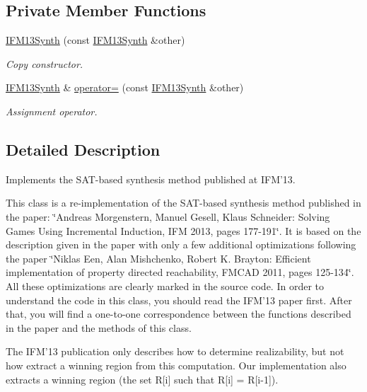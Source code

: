\subsection*{Private Member Functions}
\begin{DoxyCompactItemize}
\item 
\hyperlink{classIFM13Synth_aaa3a0095cffcd56cc6f13ba80362a589}{I\-F\-M13\-Synth} (const \hyperlink{classIFM13Synth}{I\-F\-M13\-Synth} \&other)
\begin{DoxyCompactList}\small\item\em Copy constructor. \end{DoxyCompactList}\item 
\hyperlink{classIFM13Synth}{I\-F\-M13\-Synth} \& \hyperlink{classIFM13Synth_abbce31c761c00c1fca82f93dede10931}{operator=} (const \hyperlink{classIFM13Synth}{I\-F\-M13\-Synth} \&other)
\begin{DoxyCompactList}\small\item\em Assignment operator. \end{DoxyCompactList}\end{DoxyCompactItemize}


\subsection{Detailed Description}
Implements the S\-A\-T-\/based synthesis method published at I\-F\-M'13. 

This class is a re-\/implementation of the S\-A\-T-\/based synthesis method published in the paper\-: \char`\"{}\-Andreas Morgenstern, Manuel Gesell, Klaus Schneider\-: Solving Games Using
\-Incremental Induction, I\-F\-M 2013, pages 177-\/191\char`\"{}. It is based on the description given in the paper with only a few additional optimizations following the paper \char`\"{}\-Niklas Een, Alan Mishchenko, Robert K. Brayton\-: Efficient implementation of property
directed reachability, F\-M\-C\-A\-D 2011, pages 125-\/134\char`\"{}. All these optimizations are clearly marked in the source code. In order to understand the code in this class, you should read the I\-F\-M'13 paper first. After that, you will find a one-\/to-\/one correspondence between the functions described in the paper and the methods of this class.

The I\-F\-M'13 publication only describes how to determine realizability, but not how extract a winning region from this computation. Our implementation also extracts a winning region (the set R\mbox{[}i\mbox{]} such that R\mbox{[}i\mbox{]} = R\mbox{[}i-\/1\mbox{]}).


